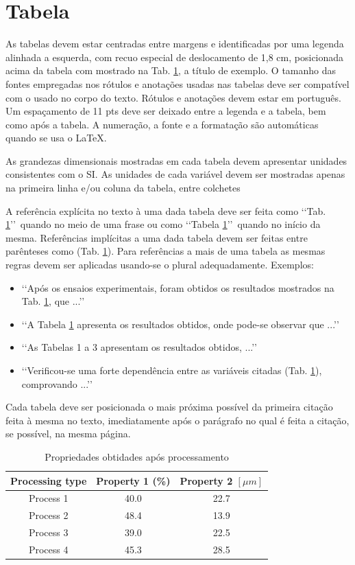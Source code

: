 \section{Tabela}

As tabelas devem estar centradas entre margens e identificadas por uma legenda 
alinhada a esquerda, com recuo especial de deslocamento de 1,8 cm, posicionada 
acima da tabela com mostrado na Tab. \ref{tab01}, a título de 
exemplo. O tamanho das fontes empregadas nos rótulos e anotações usadas nas 
tabelas deve ser compatível com o usado no corpo do texto. Rótulos e anotações 
devem estar em português. Um espaçamento de 11 pts deve ser deixado entre a 
legenda e a tabela, bem como após a tabela. A numeração, a fonte e a formatação
são automáticas quando se usa o \LaTeX.

As grandezas dimensionais mostradas em cada tabela devem apresentar unidades 
consistentes com o SI. As unidades de cada variável devem ser mostradas apenas 
na primeira linha e/ou coluna da tabela, entre colchetes 

A referência explícita no texto à uma dada tabela deve ser feita como 
\lq\lq Tab. \ref{tab01}\rq\rq\ quando no meio de uma frase ou como 
\lq\lq Tabela \ref{tab01}\rq\rq\ quando no início da mesma. Referências 
implícitas a uma dada tabela devem ser feitas entre parênteses como 
(Tab. \ref{tab01}). Para referências a mais de uma tabela as mesmas 
regras devem ser aplicadas usando-se o plural adequadamente. Exemplos:
\begin{itemize}
	\item \lq\lq Após os ensaios experimentais, foram obtidos os resultados 
	mostrados na Tab. \ref{tab01}, que ...\rq\rq
	\item \lq\lq A Tabela \ref{tab01} apresenta os resultados obtidos, onde 
	pode-se observar que ...\rq\rq
	\item \lq\lq As Tabelas 1 a 3 apresentam os resultados obtidos, ...\rq\rq
	\item \lq\lq Verificou-se uma forte dependência entre as variáveis citadas 
	(Tab. \ref{tab01}), comprovando ...\rq\rq
\end{itemize}

Cada tabela deve ser posicionada o mais próxima possível da primeira citação 
feita à mesma no texto, imediatamente após o parágrafo no qual é feita a 
citação, se possível, na mesma página.

\begin{table}[h]
	\centering
	\caption{Propriedades obtidades após processamento}
	\label{tab01}
	
	\begin{tabular}{ccc}
		\toprule
		\textbf{Processing type} & \textbf{Property 1} (\%) & 
		\textbf{Property 2} $[\mu m]$ \\
		\midrule
		Process 1 & 40.0 & 22.7 \\
		Process 2 & 48.4 & 13.9 \\
		Process 3 & 39.0 & 22.5 \\
		Process 4 & 45.3 & 28.5 \\
		\bottomrule
	\end{tabular}
\end{table}

